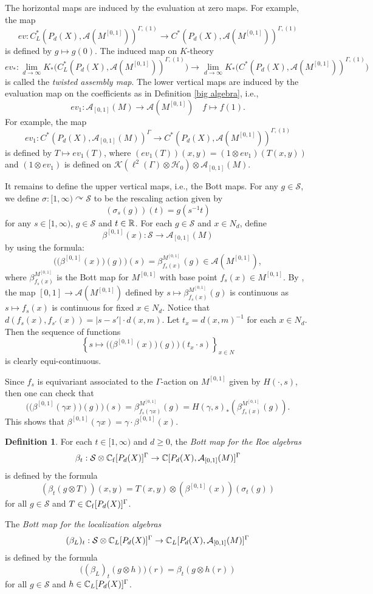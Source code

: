 \documentclass[11pt]{article}
\theoremstyle{definition}
\newtheorem{Def}{Definition}[section]
\theoremstyle{plain}
\def\A{\mathcal A}\def\C{\mathcal C}\def\B{\mathcal B}\def\E{\mathcal E}\def\O{\mathcal O}\def\h{\mathfrak h}\def\K{\mathcal K}\def\F{\mathcal F}\def\P{\mathcal P}\def\L{\mathcal L}\def\R{\mathcal R}\def\Q{\mathcal Q}\def\H{\mathcal H}\def\S{\mathcal S}\def\N{\mathcal N}\def\U{\mathcal U}\def\V{\mathcal V}
\def\ox{\otimes}
\def\ox{\otimes}
\def\Ga{\Gamma}
\def\car{\curvearrowright}
\begin{document}
The horizontal maps are induced by the evaluation at zero maps. For example, the map
$$ev:C^*_L(P_d(X),\A(M^{[0,1]}))^{\Ga,(1)}\to C^*(P_d(X),\A(M^{[0,1]}))^{\Ga,(1)}$$
is defined by $g\mapsto g(0)$. The induced map on $K$-theory
\begin{equation}\label{eq:twisted-assembly}
    ev_*:\lim_{d\to\infty}K_*\Big(C^*_L(P_d(X),\A(M^{[0,1]}))^{\Ga,(1)}\Big)\to\lim_{d\to\infty}K_*\Big(C^*(P_d(X),\A(M^{[0,1]}))^{\Ga,(1)}\Big)
\end{equation}
is called the \emph{twisted assembly map}. The lower vertical maps are induced by the evaluation map on the coefficients as in Definition \ref{big algebra}, i.e.,
$$ev_1:\A_{[0,1]}(M)\to\A(M^{[0,1]})\quad f\mapsto f(1).$$
For example, the map
$$ev_1:C^*(P_d(X),\A_{[0,1]}(M))^{\Ga}\to C^*(P_d(X),\A(M^{[0,1]}))^{\Ga,(1)}$$
is defined by $T\mapsto ev_1(T)$, where $(ev_1(T))(x,y)=(1\ox ev_1)(T(x,y))$ and $(1\ox ev_1)$ is defined on $\K(\ell^2(\Ga)\ox\H_0)\ox\A_{[0,1]}(M)$.

It remains to define the upper vertical maps, i.e., the Bott maps. For any $g\in\S$, we define $\sigma:[1,\infty)\car\S$ to be the rescaling action given by
$$(\sigma_s(g))(t)=g(s^{-1}t)$$ 
for any $s\in[1,\infty)$, $g\in\S$ and $t\in\mathbb R$. For each $g\in \S$ and $x\in N_d$, define
$$\beta^{[0,1]}(x):\S\to\A_{[0,1]}(M)$$
by using the formula:
$$\Big(\Big(\beta^{[0,1]}(x)\Big)(g)\Big)(s)=\beta^{M^{[0,1]}}_{f_s(x)}(g)\in\A(M^{[0,1]}),$$
where $\beta^{M^{[0,1]}}_{f_s(x)}$ is the Bott map for $M^{[0,1]}$ with base point $f_s(x)\in M^{[0,1]}$. By \cite[Proposition 5.11]{GWY2018}, the map $[0,1]\to\A(M^{[0,1]})$ defined by $s\mapsto\beta^{M^{[0,1]}}_{f_s(x)}(g)$ is continuous as $s\mapsto f_s(x)$ is continuous for fixed $x\in N_d$. Notice that $d(f_s(x),f_{s'}(x))=|s-s'|\cdot d(x,m)$. Let $t_x=d(x,m)^{-1}$ for each $x\in N_d$. Then the sequence of functions
$$\left\{s\mapsto\Big(\Big(\beta^{[0,1]}(x)\Big)(g)\Big)(t_x\cdot s)\right\}_{x\in N}$$
is clearly equi-continuous.

Since $f_s$ is equivariant associated to the $\Ga$-action on $M^{[0,1]}$ given by $H(\cdot,s)$, then one can check that
\[\Big(\Big(\beta^{[0,1]}(\gamma x)\Big)(g)\Big)(s)=\beta^{M^{[0,1]}}_{f_s(\gamma x)}(g)=H(\gamma,s)_*(\beta^{M^{[0,1]}}_{f_s(x)}(g)).\]
This shows that $\beta^{[0,1]}(\gamma x)=\gamma\cdot\beta^{[0,1]}(x)$.

\begin{Def}\label{Big Bott map}
For each $t\in[1,\infty)$ and $d\geq 0$, the \emph{Bott map for the Roe algebras}
$$\beta_t:\S\ox\IC_{\rm f}[P_d(X)]^{\Ga}\to\IC[P_d(X),\A_{[0,1]}(M)]^{\Ga}$$
is defined by the formula
$$(\beta_t(g\ox T))(x,y)=T(x,y)\ox(\beta^{[0,1]}(x))(\sigma_t(g))$$
for all $g\in\S$ and $T\in\IC_{\rm f}[P_d(X)]^{\Ga}$.

The \emph{Bott map for the localization algebras}
$$(\beta_L)_t:\S\ox\IC_L[P_d(X)]^{\Ga}\to\IC_L[P_d(X),\A_{[0,1]}(M)]^{\Ga}$$
is defined by the formula
$$\Big((\beta_L)_t(g\ox h)\Big)(r)=\beta_t(g\ox h(r))$$
for all $g\in\S$ and $h\in\IC_{L}[P_d(X)]^{\Ga}$.
\end{Def}
\end{document}
